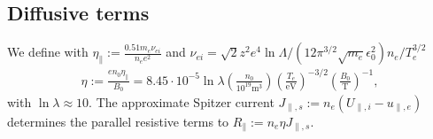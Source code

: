\subsection{Diffusive terms}\label{sec:dissres}
We define with
$\eta_\parallel := \frac{0.51 m_e \nu_{ei}}{n_e e^2}$ and $\nu_{ei} = \sqrt{2} z^2 e^4 \ln \Lambda/ (12\pi^{3/2} \sqrt{m_e} \epsilon_0^2) n_e /T_e^{3/2}$
\begin{align}
  \eta:=\frac{en_0\eta_\parallel}{B_0} = 8.45\cdot 10^{-5}\ln \lambda \left(\frac{n_0}{10^{19}\text{m}^3}\right) \left(\frac{T_e}{\text{eV}}\right)^{-3/2} \left(\frac{B_0}{\text{T}}\right)^{-1},
    \label{eq:resistivity}
\end{align}
with $\ln \lambda \approx 10$.
 The approximate Spitzer current \(J_{\parallel,s}:= n_e \left(U_{\parallel,i} - u_{\parallel,e}\right)\)
 determines the parallel resistive terms to $R_\parallel:= n_e\eta J_{\parallel,s}$.

